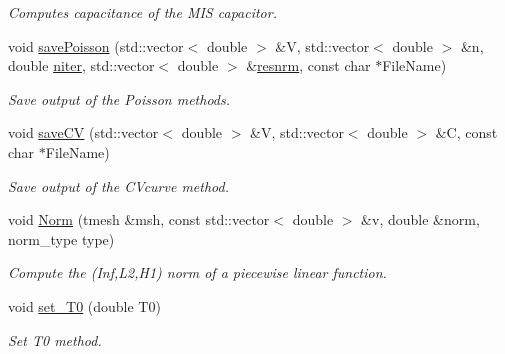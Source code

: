 \begin{DoxyCompactItemize}
\begin{DoxyCompactList}\small\item\em Computes capacitance of the M\+IS capacitor. \end{DoxyCompactList}\item 
\mbox{\label{class_probl_ad04cfadb29011237c97f8c5837bc0a09}} 
void \mbox{\hyperlink{class_probl_ad04cfadb29011237c97f8c5837bc0a09}{save\+Poisson}} (std\+::vector$<$ double $>$ \&V, std\+::vector$<$ double $>$ \&n, double \mbox{\hyperlink{class_probl_a316f343116c835fc18e95aeec2f87407}{niter}}, std\+::vector$<$ double $>$ \&\mbox{\hyperlink{class_probl_a8366d5132536de44debdda93a930a4cc}{resnrm}}, const char $\ast$File\+Name)
\begin{DoxyCompactList}\small\item\em Save output of the Poisson methods. \end{DoxyCompactList}\item 
\mbox{\label{class_probl_a7a5c9f01a55b9c40bdd88bec55d2d81d}} 
void \mbox{\hyperlink{class_probl_a7a5c9f01a55b9c40bdd88bec55d2d81d}{save\+CV}} (std\+::vector$<$ double $>$ \&V, std\+::vector$<$ double $>$ \&C, const char $\ast$File\+Name)
\begin{DoxyCompactList}\small\item\em Save output of the C\+Vcurve method. \end{DoxyCompactList}\item 
\mbox{\label{class_probl_a5f23469327dd5e2c4e9cd80e30c3f64a}} 
void \mbox{\hyperlink{class_probl_a5f23469327dd5e2c4e9cd80e30c3f64a}{Norm}} (tmesh \&msh, const std\+::vector$<$ double $>$ \&v, double \&norm, norm\+\_\+type type)
\begin{DoxyCompactList}\small\item\em Compute the (Inf,L2,H1) norm of a piecewise linear function. \end{DoxyCompactList}\item 
void \mbox{\hyperlink{class_probl_a015de30e9e1847638ec206b7d0341d8a}{set\+\_\+\+T0}} (double T0)
\begin{DoxyCompactList}\small\item\em Set T0 method. \end{DoxyCompactList}\end{DoxyCompactItemize}
